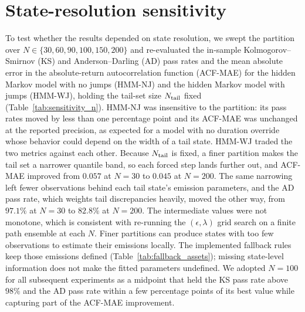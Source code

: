 \section{State-resolution sensitivity}
\label{sec:supp-sensitivity}

To test whether the results depended on state resolution, we swept the
partition over $N \in \{30, 60, 90, 100, 150, 200\}$ and
re-evaluated the in-sample Kolmogorov--Smirnov (KS) and
Anderson--Darling (AD) pass rates and the mean absolute error in the
absolute-return autocorrelation function (ACF-MAE) for the hidden
Markov model with no jumps (HMM-NJ) and the hidden Markov model with
jumps (HMM-WJ), holding the tail-set size $N_{\rm tail}$ fixed
(Table~\ref{tab:sensitivity_n}). HMM-NJ was insensitive to the
partition: its pass rates moved by less than one percentage point and
its ACF-MAE was unchanged at the reported precision, as expected for a
model with no duration override whose behavior could depend on the
width of a tail state. HMM-WJ traded the two metrics against each other. Because
$N_{\rm tail}$ is fixed, a finer partition makes the tail set a
narrower quantile band, so each forced step lands further out, and
ACF-MAE improved from $0.057$ at $N = 30$ to $0.045$ at $N = 200$. The
same narrowing left fewer observations behind each tail state's
emission parameters, and the AD pass rate, which weights tail
discrepancies heavily, moved the other way, from $97.1\%$ at $N = 30$
to $82.8\%$ at $N = 200$. The intermediate values were not monotone,
which is consistent with re-running the $(\epsilon, \lambda)$ grid
search on a finite path ensemble at each $N$. Finer partitions can
produce states with too few observations to estimate their emissions
locally. The implemented fallback rules keep those emissions defined
(Table~\ref{tab:fallback_assets}); missing state-level information
does not make the fitted parameters undefined. We adopted $N = 100$ for
all subsequent experiments as a midpoint that held the KS pass rate
above $98\%$ and the AD pass rate within a few percentage points of its
best value while capturing part of the ACF-MAE improvement.

